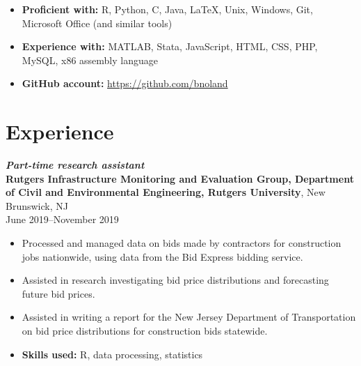 \documentclass[letterpaper,12pt]{article}
\begin{document}
\begin{itemize}
\item \textbf{Proficient with:} R, Python, C, Java, \LaTeX, Unix,
  Windows, Git, Microsoft Office (and similar tools)
\item \textbf{Experience with:} MATLAB, Stata, JavaScript, HTML, CSS,
  PHP, MySQL, x86 assembly language
\item \textbf{GitHub account:} \url{https://github.com/bnoland}
\end{itemize}

\section*{Experience}

\textit{\textbf{Part-time research assistant}} \\
\textbf{Rutgers Infrastructure Monitoring and Evaluation Group,
  Department of Civil and Environmental Engineering, Rutgers
  University},
New Brunswick, NJ \\
June 2019--November 2019
\begin{itemize}
\item Processed and managed data on bids made by contractors for
  construction jobs nationwide, using data from the Bid Express
  bidding service.
\item Assisted in research investigating bid price distributions and
  forecasting future bid prices.
\item Assisted in writing a report for the New Jersey Department of
  Transportation on bid price distributions for construction bids
  statewide.
\item \textbf{Skills used:} R, data processing, statistics
\end{itemize}
\end{document}
